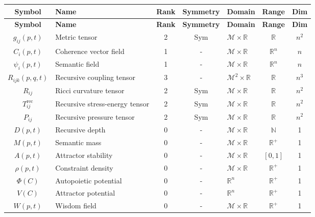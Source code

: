 {\small
\renewcommand{\arraystretch}{1.1}
\begin{longtable}{|c|p{5.5cm}|c|c|p{1.5cm}|c|c|}
\hline
\textbf{Symbol} & \textbf{Name} & \textbf{Rank} & \textbf{Symmetry} & \textbf{Domain} & \textbf{Range} & \textbf{Dim} \\
\hline
\endfirsthead
\hline
\textbf{Symbol} & \textbf{Name} & \textbf{Rank} & \textbf{Symmetry} & \textbf{Domain} & \textbf{Range} & \textbf{Dim} \\
\hline
\endhead
\(g_{ij}(p,t)\) & Metric tensor & 2 & Sym & \(\mathcal{M} \times \mathbb{R}\) & \(\mathbb{R}\) & \(n^2\) \\
\hline
\(C_i(p,t)\) & Coherence vector field & 1 & - & \(\mathcal{M} \times \mathbb{R}\) & \(\mathbb{R}^n\) & \(n\) \\
\hline
\(\psi_i(p,t)\) & Semantic field & 1 & - & \(\mathcal{M} \times \mathbb{R}\) & \(\mathbb{R}^n\) & \(n\) \\
\hline
\(R_{ijk}(p,q,t)\) & Recursive coupling tensor & 3 & - & \(\mathcal{M}^2 \times \mathbb{R}\) & \(\mathbb{R}\) & \(n^3\) \\
\hline
\(R_{ij}\) & Ricci curvature tensor & 2 & Sym & \(\mathcal{M} \times \mathbb{R}\) & \(\mathbb{R}\) & \(n^2\) \\
\hline
\(T_{ij}^{\text{rec}}\) & Recursive stress-energy tensor & 2 & Sym & \(\mathcal{M} \times \mathbb{R}\) & \(\mathbb{R}\) & \(n^2\) \\
\hline
\(P_{ij}\) & Recursive pressure tensor & 2 & Sym & \(\mathcal{M} \times \mathbb{R}\) & \(\mathbb{R}\) & \(n^2\) \\
\hline
\(D(p,t)\) & Recursive depth & 0 & - & \(\mathcal{M} \times \mathbb{R}\) & \(\mathbb{N}\) & 1 \\
\hline
\(M(p,t)\) & Semantic mass & 0 & - & \(\mathcal{M} \times \mathbb{R}\) & \(\mathbb{R}^+\) & 1 \\
\hline
\(A(p,t)\) & Attractor stability & 0 & - & \(\mathcal{M} \times \mathbb{R}\) & \([0,1]\) & 1 \\
\hline
\(\rho(p,t)\) & Constraint density & 0 & - & \(\mathcal{M} \times \mathbb{R}\) & \(\mathbb{R}^+\) & 1 \\
\hline
\(\Phi(C)\) & Autopoietic potential & 0 & - & \(\mathbb{R}^n\) & \(\mathbb{R}^+\) & 1 \\
\hline
\(V(C)\) & Attractor potential & 0 & - & \(\mathbb{R}^n\) & \(\mathbb{R}^+\) & 1 \\
\hline
\(W(p,t)\) & Wisdom field & 0 & - & \(\mathcal{M} \times \mathbb{R}\) & \(\mathbb{R}^+\) & 1 \\

\end{longtable}}
